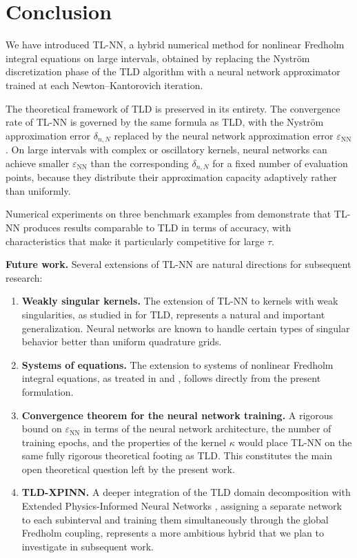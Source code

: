 \documentclass[12pt, a4paper]{article}
\newcommand{\epsNN}{\varepsilon_{\mathrm{NN}}}
\begin{document}
\section{Conclusion}
\label{sec:conclusion}

We have introduced TL-NN, a hybrid numerical method for
nonlinear Fredholm integral equations on large intervals,
obtained by replacing the Nystr\"{o}m discretization phase
of the TLD algorithm \cite{sedka2025} with a neural network
approximator trained at each Newton--Kantorovich iteration.

The theoretical framework of TLD is preserved in its entirety.
The convergence rate of TL-NN is governed by the same formula
as TLD, with the Nystr\"{o}m approximation error $\delta_{n,N}$
replaced by the neural network approximation error $\epsNN$.
On large intervals with complex or oscillatory kernels, neural
networks can achieve smaller $\epsNN$ than the corresponding
$\delta_{n,N}$ for a fixed number of evaluation points,
because they distribute their approximation capacity
adaptively rather than uniformly.

Numerical experiments on three benchmark examples from
\cite{sedka2025} demonstrate that TL-NN produces results
comparable to TLD in terms of accuracy, with characteristics
that make it particularly competitive for large $\tau$.

\textbf{Future work.}
Several extensions of TL-NN are natural directions for
subsequent research:
\begin{enumerate}
  \item \textbf{Weakly singular kernels.} The extension of
    TL-NN to kernels with weak singularities, as studied
    in \cite{sedka2022b} for TLD, represents a natural
    and important generalization. Neural networks are known
    to handle certain types of singular behavior better
    than uniform quadrature grids.
  \item \textbf{Systems of equations.} The extension to
    systems of nonlinear Fredholm integral equations,
    as treated in \cite{sedka2022a} and \cite{sedka2022b},
    follows directly from the present formulation.
  \item \textbf{Convergence theorem for the neural network
    training.} A rigorous bound on $\epsNN$ in terms of
    the neural network architecture, the number of training
    epochs, and the properties of the kernel $\kappa$ would
    place TL-NN on the same fully rigorous theoretical
    footing as TLD. This constitutes the main open
    theoretical question left by the present work.
  \item \textbf{TLD-XPINN.} A deeper integration of the
    TLD domain decomposition with Extended Physics-Informed
    Neural Networks \cite{jagtap2020}, assigning a separate
    network to each subinterval and training them
    simultaneously through the global Fredholm coupling,
    represents a more ambitious hybrid that we plan to
    investigate in subsequent work.
\end{enumerate}
\end{document}
